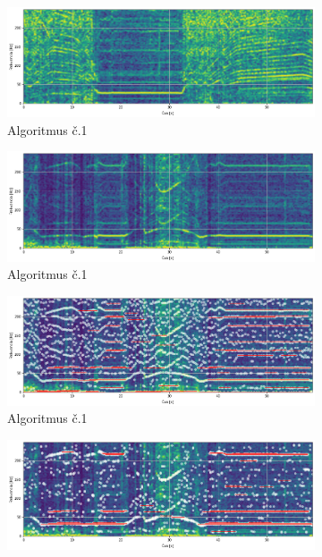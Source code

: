 \begin{figure}[h]
	\centering
	\begin{subfigure}{\textwidth}
        \centering
     	\includegraphics[width=\textwidth]{figures/verification/L83-dataset-spectrum.png}
     	\caption{Algoritmus č.1}
     \end{subfigure}
	\begin{subfigure}{\textwidth}
        \centering
     	\includegraphics[width=\textwidth]{figures/verification/L35-dataset-spectrum.png}
     	\caption{Algoritmus č.1}
     \end{subfigure}
     \begin{subfigure}{\textwidth}
        \centering
     	\includegraphics[width=\textwidth]{figures/verification/L35-dataset-A1.png}
     	\caption{Algoritmus č.1}
     \end{subfigure}
     \begin{subfigure}{\textwidth}
    	\centering
        \includegraphics[width=\textwidth]{figures/verification/L35-dataset-A2.png}

\end{subfigure}
\end{figure}
